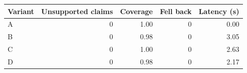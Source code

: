 \begin{tabular}{lrrrr}
\toprule
Variant & Unsupported claims & Coverage & Fell back & Latency (s) \\
\midrule
A & 0 & 1.00 & 0 & 0.00 \\
B & 0 & 0.98 & 0 & 3.05 \\
C & 0 & 1.00 & 0 & 2.63 \\
D & 0 & 0.98 & 0 & 2.17 \\
\bottomrule
\end{tabular}
